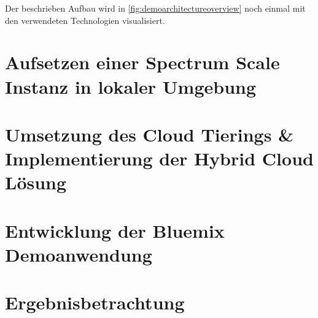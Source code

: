 Der beschrieben Aufbau wird in \autoref{fig:demoarchitectureoverview} noch einmal mit den verwendeten Technologien visualisiert. 

\section{Aufsetzen einer Spectrum Scale Instanz in lokaler Umgebung}


\section{Umsetzung des Cloud Tierings \& Implementierung der Hybrid Cloud Lösung}


\section{Entwicklung der Bluemix Demoanwendung}\label{sec:application}


\section{Ergebnisbetrachtung}
